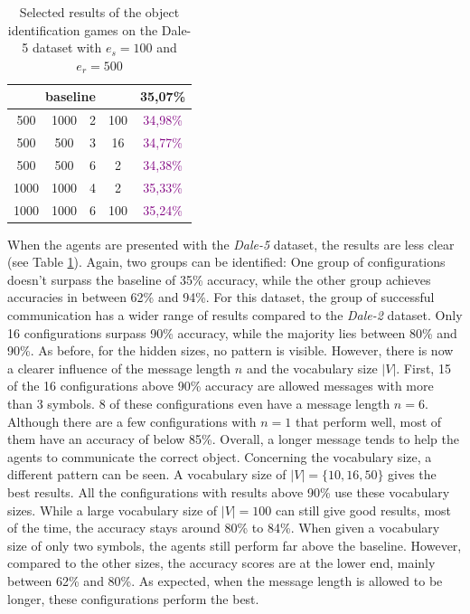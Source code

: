 \begin{table}[ht]
\begin{tabular}{cccc|c}
        \multicolumn{4}{c|}{baseline} & {35,07\%}                                                     \\\midrule
        {500}                         & {1000}    & {2} & {100} & \textcolor{purple}{34,98\%}         \\
        {500}                         & {500}     & {3} & {16}  & \textcolor{purple}{34,77\%}         \\
        {500}                         & {500}     & {6} & {2}   & \textcolor{purple}{34,38\%}         \\
        {1000}                        & {1000}    & {4} & {2}   & \textcolor{purple}{35,33\%}         \\
        {1000}                        & {1000}    & {6} & {100} & \textcolor{purple}{35,24\%}         \\
        \bottomrule
    \end{tabular}
    \caption{Selected results of the object identification games on the Dale-5 dataset with $e_s=100$ and $e_r=500$}
    \label{tab:results_discriminator_dale-5}
\end{table}

When the agents are presented with the \emph{Dale-5} dataset, the results are less clear (see Table \ref{tab:results_discriminator_dale-5}).
Again, two groups can be identified: One group of configurations doesn't surpass the baseline of 35\% accuracy, while the other group achieves accuracies in between 62\% and 94\%.
For this dataset, the group of successful communication has a wider range of results compared to the \emph{Dale-2} dataset.
Only 16 configurations surpass 90\% accuracy, while the majority lies between 80\% and 90\%.
As before, for the hidden sizes, no pattern is visible.
However, there is now a clearer influence of the message length $n$ and the vocabulary size $|V|$.
First, 15 of the 16 configurations above 90\% accuracy are allowed messages with more than 3 symbols.
8 of these configurations even have a message length $n = 6$.
Although there are a few configurations with $n = 1$ that perform well, most of them have an accuracy of below 85\%.
Overall, a longer message tends to help the agents to communicate the correct object.
Concerning the vocabulary size, a different pattern can be seen.
A vocabulary size of $|V| = \{10,16,50\}$ gives the best results.
All the configurations with results above 90\% use these vocabulary sizes.
While a large vocabulary size of $|V| = 100$ can still give good results, most of the time, the accuracy stays around 80\% to 84\%.
When given a vocabulary size of only two symbols, the agents still perform far above the baseline.
However, compared to the other sizes, the accuracy scores are at the lower end, mainly between 62\% and 80\%.
As expected, when the message length is allowed to be longer, these configurations perform the best.

